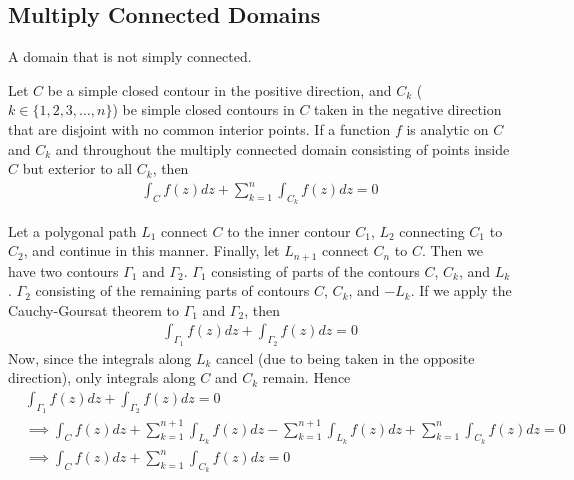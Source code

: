 \documentclass[12pt, english]{book}
\makeatletter
\renewenvironment{proof}[1][\proofname]{\par
	\pushQED{\qed}%
	\normalfont \topsep6\p@\@plus6\p@\relax
	\list{}{%
		\settowidth{\leftmargin}{\itshape\proofname:\hskip\labelsep}%
		\setlength{\labelwidth}{0pt}%
		\setlength{\itemindent}{-\leftmargin}%
		}%
	\item[\hskip\labelsep\itshape#1\@addpunct{:}]\ignorespaces
	}{\popQED\endlist\@endpefalse}
\makeatother
\begin{document}
	\subsection{Multiply Connected Domains} \label{Multiply Connected Domains Subsection - Complex}
	
	\begin{definition}
		A domain that is not simply connected.
	\end{definition}

	\begin{theorem}
		\label{Contour integral over Multiply Connected Domains Theorem - Complex}
		Let \(C\) be a simple closed contour in the positive direction, and \(C_k\) (\(k \in \{1,2,3,\ldots, n\}\)) be simple closed contours in \(C\) taken in the negative direction that are disjoint with no common interior points. If a function \(f\) is analytic on \(C\) and \(C_k\) and throughout the multiply connected domain consisting of points inside \(C\) but exterior to all \(C_k\), then
		\begin{align*}
			\int_{C} f(z) dz + \sum_{k=1}^{n} \int_{C_k} f(z) dz = 0
		\end{align*}
	\end{theorem}
	\begin{proof}
		Let a polygonal path \(L_1\) connect \(C\) to the inner contour \(C_1\), \(L_2\) connecting \(C_1\) to \(C_2\), and continue in this manner. Finally, let \(L_{n+1}\) connect \(C_n\) to \(C\). Then we have two contours \(\Gamma_1\) and \(\Gamma_2\). \(\Gamma_1\) consisting of parts of the contours \(C\), \(C_k\), and \(L_k\). \(\Gamma_2\) consisting of the remaining parts of contours \(C\), \(C_k\), and \(-L_k\). If we apply the Cauchy-Goursat theorem to \(\Gamma_1\) and \(\Gamma_2\), then
		\begin{align*}
			\int_{\Gamma_1} f(z) dz + \int_{\Gamma_2} f(z) dz = 0
		\end{align*}
		Now, since the integrals along \(L_k\) cancel (due to being taken in the opposite direction), only integrals along \(C\) and \(C_k\) remain. Hence
		\begin{align*}
			&\int_{\Gamma_1} f(z) dz + \int_{\Gamma_2} f(z) dz = 0 \\
			&\implies \int_{C} f(z) dz + \sum_{k=1}^{n+1} \int_{L_k} f(z) dz - \sum_{k=1}^{n+1} \int_{L_k} f(z) dz + \sum_{k=1}^{n} \int_{C_k} f(z) dz = 0 \\
			&\implies \int_{C} f(z) dz + \sum_{k=1}^{n} \int_{C_k} f(z) dz = 0
		\end{align*}
	\end{proof}
\end{document}
